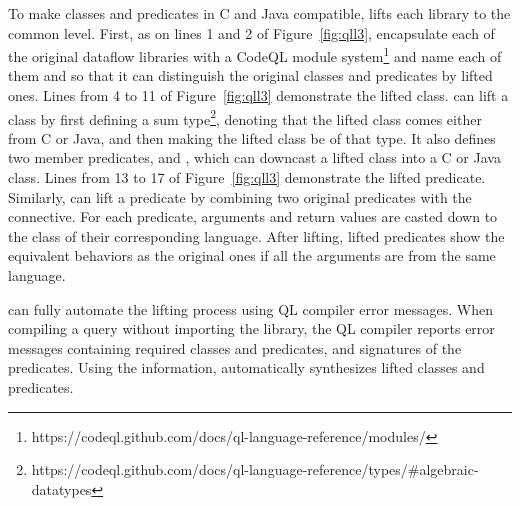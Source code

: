 To make classes and predicates in C and Java compatible,
\ours lifts each library to the common level.
First, as on lines 1 and 2 of Figure~\ref{fig:qll3},
\ours encapsulate each of the original dataflow libraries with a CodeQL
module system\footnote{https://codeql.github.com/docs/ql-language-reference/modules/}
and name each of them  and  so that it can distinguish the original
classes and predicates by lifted ones. 
Lines from 4 to 11 of Figure~\ref{fig:qll3} demonstrate the lifted class.
\ours can lift a class by first defining a sum type\footnote{https://codeql.github.com/docs/ql-language-reference/types/\#algebraic-datatypes},
denoting that the lifted class comes either from C or Java, and then making the
lifted class be of that type.  It also defines two member predicates,
 and ,
which can downcast a lifted class into a C or Java class.
Lines from 13 to 17 of Figure~\ref{fig:qll3} demonstrate the lifted predicate.
Similarly, \ours can lift a predicate by combining two original predicates with
the  connective. For each predicate, arguments and return values are casted down
to the class of their corresponding language.
After lifting, lifted predicates show the equivalent behaviors as the
original ones if all the arguments are from the same language.

\ours can fully automate the lifting process using QL compiler error
messages. When compiling a query without importing the library, the QL compiler
reports error messages containing required classes and predicates, and
signatures of the predicates. Using the information, \ours
automatically synthesizes lifted classes and predicates.



